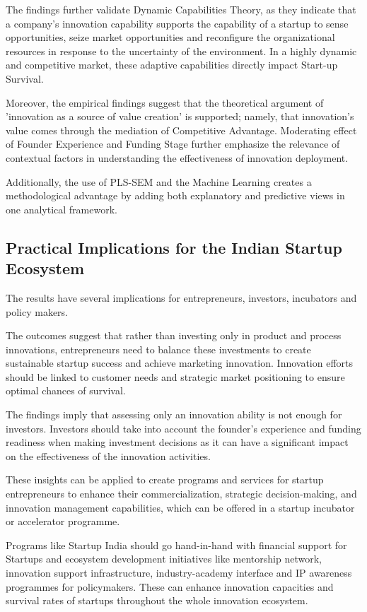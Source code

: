 \documentclass{ieeeaccess}
\begin{document}
The findings further validate Dynamic Capabilities Theory, as they indicate that a company's innovation capability supports the capability of a startup to sense opportunities, seize market opportunities and reconfigure the organizational resources in response to the uncertainty of the environment. In a highly dynamic and competitive market, these adaptive capabilities directly impact Start-up Survival.

Moreover, the empirical findings suggest that the theoretical argument of 'innovation as a source of value creation' is supported; namely, that innovation's value comes through the mediation of Competitive Advantage. Moderating effect of Founder Experience and Funding Stage further emphasize the relevance of contextual factors in understanding the effectiveness of innovation deployment.

Additionally, the use of PLS-SEM and the Machine Learning creates a methodological advantage by adding both explanatory and predictive views in one analytical framework.

\subsection{Practical Implications for the Indian Startup Ecosystem}

The results have several implications for entrepreneurs, investors, incubators and policy makers.

The outcomes suggest that rather than investing only in product and process innovations, entrepreneurs need to balance these investments to create sustainable startup success and achieve marketing innovation. Innovation efforts should be linked to customer needs and strategic market positioning to ensure optimal chances of survival.

The findings imply that assessing only an innovation ability is not enough for investors. Investors should take into account the founder's experience and funding readiness when making investment decisions as it can have a significant impact on the effectiveness of the innovation activities.

These insights can be applied to create programs and services for startup entrepreneurs to enhance their commercialization, strategic decision-making, and innovation management capabilities, which can be offered in a startup incubator or accelerator programme.

Programs like Startup India should go hand-in-hand with financial support for Startups and ecosystem development initiatives like mentorship network, innovation support infrastructure, industry-academy interface and IP awareness programmes for policymakers. These can enhance innovation capacities and survival rates of startups throughout the whole innovation ecosystem.
\end{document}
